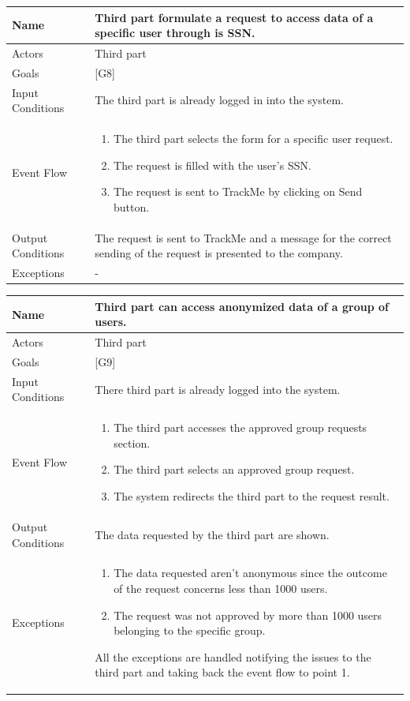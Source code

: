 \documentclass{article}
\begin{document}
\begin{center}
    \begin{tabular}{ | l | p{10cm} |}
    \hline
    Name & Third part formulate a request to access data of a specific user through is SSN. \\ \hline
    Actors & Third part\\ \hline
   	Goals & {[G8]}\\ \hline
    Input Conditions & The third part is already logged in into the system.\\ \hline
    Event Flow & \begin{enumerate}
    	\item The third part selects the form for a specific user request.
    	\item The request is filled with the user's SSN.
    	\item The request is sent to TrackMe by clicking on Send button. 
    \end{enumerate} \\ \hline
    Output Conditions & The request is sent to TrackMe and a message for the correct sending of the request is presented to the company.  \\ \hline
    Exceptions & -    \\ \hline
    \end{tabular}
\end{center}

\begin{center}
    \begin{tabular}{ | l | p{10cm} |}
    \hline
    Name & Third part can access anonymized data of a group of users.\\ \hline
    Actors & Third part\\ \hline
   	Goals & {[G9]}\\ \hline
    Input Conditions & There third part is already logged into the system.\\ \hline
    Event Flow & \begin{enumerate}
    	\item The third part accesses the approved group requests section.
		\item The third part selects an approved group request.
		\item The system redirects the third part to the request result.
    \end{enumerate} \\ \hline
    Output Conditions & The data requested by the third part are shown.  \\ \hline
    Exceptions & \begin{enumerate}
  		\item The data requested aren't anonymous since the outcome of the request concerns less than 1000 users.
  		\item The request was not approved by more than 1000 users belonging to the specific group.
\end{enumerate} All the exceptions are handled notifying the issues to the third part and taking back the event flow to point 1.    \\ \hline
    \end{tabular}
\end{center}
\end{document}
